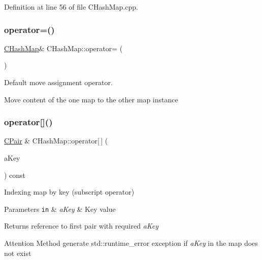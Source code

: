 Definition at line 56 of file C\+Hash\+Map.\+cpp.

\mbox{\label{class_c_hash_map_a3b494fb820ecd54937c05023fc67c564}} 
\subsubsection{\texorpdfstring{operator=()}{operator=()}\hspace{0.1cm}{\footnotesize\ttfamily [2/2]}}
{\footnotesize\ttfamily \hyperlink{class_c_hash_map}{C\+Hash\+Map}\& C\+Hash\+Map\+::operator= (\begin{DoxyParamCaption}\item[{\hyperlink{class_c_hash_map}{C\+Hash\+Map} \&\&}]{ }\end{DoxyParamCaption})\hspace{0.3cm}{\ttfamily [default]}}



Default move assignment operator. 

Move content of the one map to the other map instance \mbox{\label{class_c_hash_map_a4e61bb9cef654ff2377598e8d737a732}} 
\subsubsection{\texorpdfstring{operator[]()}{operator[]()}}
{\footnotesize\ttfamily \hyperlink{class_c_pair}{C\+Pair} \& C\+Hash\+Map\+::operator\mbox{[}$\,$\mbox{]} (\begin{DoxyParamCaption}\item[{const \hyperlink{class_c_pair_a9030f3ef2a07301c105bdf17620ae66a}{C\+Pair\+::\+T\+Key} \&}]{a\+Key }\end{DoxyParamCaption}) const}



Indexing map by key (subscript operator) 


\begin{DoxyParams}[1]{Parameters}
\mbox{\tt in}  & {\em a\+Key} & Key value \\
\hline
\end{DoxyParams}
\begin{DoxyReturn}{Returns}
reference to first pair with required {\itshape a\+Key} 
\end{DoxyReturn}
\begin{DoxyAttention}{Attention}
Method generate {\ttfamily std\+::runtime\+\_\+error} exception if {\itshape a\+Key} in the map does not exist 
\end{DoxyAttention}



